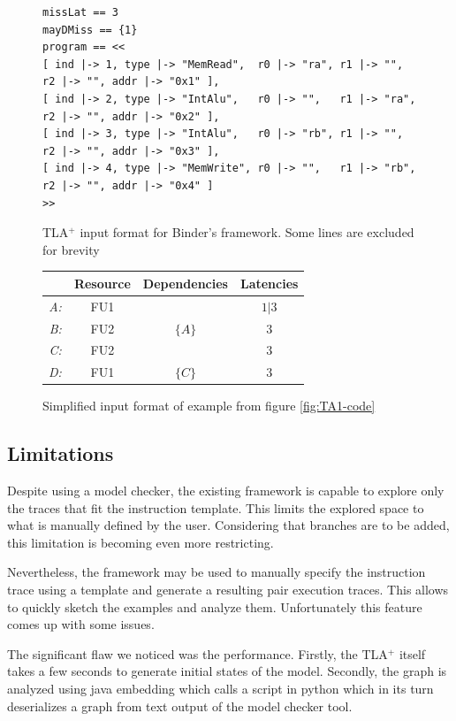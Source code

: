 \begin{figure}[H]
\begin{lstlisting}[basicstyle=\fontsize{8}{13}\selectfont\ttfamily]
missLat == 3
mayDMiss == {1}
program == <<
[ ind |-> 1, type |-> "MemRead",  r0 |-> "ra", r1 |-> "",   r2 |-> "", addr |-> "0x1" ],
[ ind |-> 2, type |-> "IntAlu",   r0 |-> "",   r1 |-> "ra", r2 |-> "", addr |-> "0x2" ],
[ ind |-> 3, type |-> "IntAlu",   r0 |-> "rb", r1 |-> "",   r2 |-> "", addr |-> "0x3" ],
[ ind |-> 4, type |-> "MemWrite", r0 |-> "",   r1 |-> "rb", r2 |-> "", addr |-> "0x4" ]
>>
\end{lstlisting}
\caption{TLA$^+$ input format for Binder's framework. Some lines are excluded for brevity}
\label{fig:TLA-format}
\end{figure}


\begin{figure}[htbp]
	\centering
	\begin{tabular}{r|ccc}
    & Resource & Dependencies & Latencies \\ \hline
    \textit{A:} & FU1 &  & $1 | 3$ \\
    \textit{B:} & FU2 & $\{A\}$ & $3$ \\
    \textit{C:} & FU2 &  & $3$ \\
    \textit{D:} & FU1 & $\{C\}$ & $3$ \\
    \end{tabular}

	\caption{Simplified input format of example from figure \ref{fig:TA1-code}}
	\label{fig:input-format}
\end{figure}

\subsection{Limitations}

Despite using a model checker, the existing framework is capable to explore only the traces that fit the instruction template. This limits the explored space to what is manually defined by the user. Considering that branches are to be added, this limitation is becoming even more restricting. 

Nevertheless, the framework may be used to manually specify the instruction trace using a template and generate a resulting pair execution traces. This allows to quickly sketch the examples and analyze them. Unfortunately this feature comes up with some issues.

The significant flaw we noticed was the performance. Firstly, the TLA$^+$ itself takes a few seconds to generate initial states of the model. Secondly, the graph is analyzed using java embedding which calls a script in python which in its turn deserializes a graph from text output of the model checker tool. 

